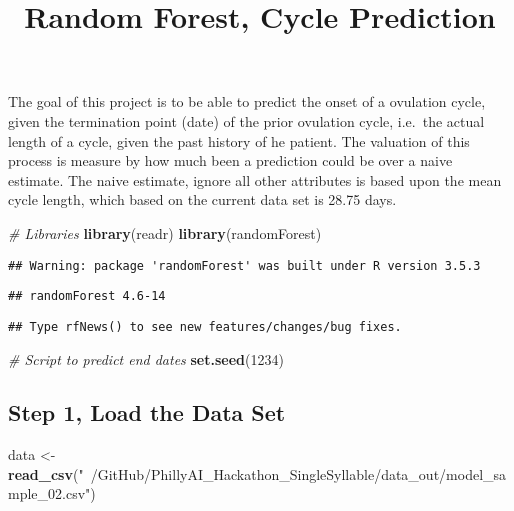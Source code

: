 \documentclass[]{article}
\title{Random Forest, Cycle Prediction}
\author{}
\date{}
\newenvironment{Shaded}{\begin{snugshade}}{\end{snugshade}}
\newcommand{\KeywordTok}[1]{\textcolor[rgb]{0.13,0.29,0.53}{\textbf{#1}}}
\newcommand{\DecValTok}[1]{\textcolor[rgb]{0.00,0.00,0.81}{#1}}
\newcommand{\StringTok}[1]{\textcolor[rgb]{0.31,0.60,0.02}{#1}}
\newcommand{\CommentTok}[1]{\textcolor[rgb]{0.56,0.35,0.01}{\textit{#1}}}
\newcommand{\NormalTok}[1]{#1}
\begin{document}
\maketitle

The goal of this project is to be able to predict the onset of a
ovulation cycle, given the termination point (date) of the prior
ovulation cycle, i.e.~the actual length of a cycle, given the past
history of he patient. The valuation of this process is measure by how
much been a prediction could be over a naive estimate. The naive
estimate, ignore all other attributes is based upon the mean cycle
length, which based on the current data set is 28.75 days.

\begin{Shaded}
\begin{Highlighting}[]
\CommentTok{# Libraries }
\KeywordTok{library}\NormalTok{(readr)}
\KeywordTok{library}\NormalTok{(randomForest)}
\end{Highlighting}
\end{Shaded}

\begin{verbatim}
## Warning: package 'randomForest' was built under R version 3.5.3
\end{verbatim}

\begin{verbatim}
## randomForest 4.6-14
\end{verbatim}

\begin{verbatim}
## Type rfNews() to see new features/changes/bug fixes.
\end{verbatim}

\begin{Shaded}
\begin{Highlighting}[]
\CommentTok{# Script to predict end dates }
\KeywordTok{set.seed}\NormalTok{(}\DecValTok{1234}\NormalTok{)}
\end{Highlighting}
\end{Shaded}

\subsection{Step 1, Load the Data Set}\label{step-1-load-the-data-set}

\begin{Shaded}
\begin{Highlighting}[]
\NormalTok{data <-}\StringTok{ }\KeywordTok{read_csv}\NormalTok{(}\StringTok{"~/GitHub/PhillyAI_Hackathon_SingleSyllable/data_out/model_sample_02.csv"}\NormalTok{)}
\end{Highlighting}
\end{Shaded}
\end{document}
